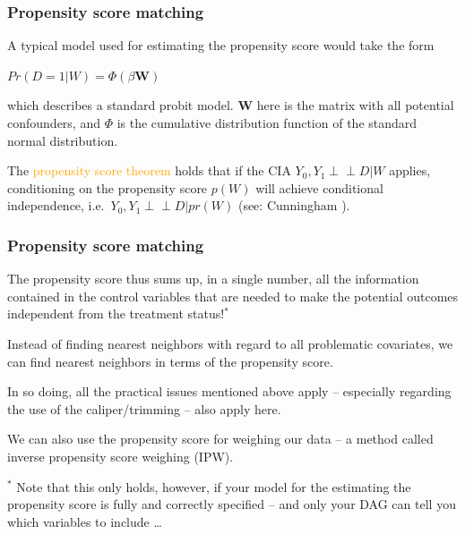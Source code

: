\documentclass[12pt,english,dvipsnames,aspectratio=169,handout]{beamer}\usepackage[]{graphicx}\usepackage[]{xcolor}
\begin{document}
\begin{frame}
  \frametitle{Propensity score matching}
\footnotesize

A typical model used for estimating the propensity score would take the form

$Pr(D = 1|W) = \Phi(\beta \bm{W})$

which describes a standard probit model. $\bm{W}$ here is the matrix with all potential confounders, and $\Phi$ is the cumulative distribution function of the standard normal distribution.

The \textcolor{orange}{propensity score theorem} holds that if the CIA $Y_{0},Y_{1} {\perp\!\!\!\perp} D|W$ applies, conditioning on the propensity score $p(W)$ will achieve conditional independence, i.e.\ $Y_{0},Y_{1} {\perp\!\!\!\perp} D|pr(W)$ (see: Cunningham \citeyear[143]{cunningham_causal_2021}).

\vspace{3cm}

\end{frame}



\begin{frame}
  \frametitle{Propensity score matching}
\footnotesize

The propensity score thus sums up, in a single number, all the information contained in the control variables that are needed to make the potential outcomes independent from the treatment status!$^*$

Instead of finding nearest neighbors with regard to all problematic covariates, we can find nearest neighbors in terms of the propensity score.

In so doing, all the practical issues mentioned above apply -- especially regarding the use of the caliper/trimming -- also apply here. 

We can also use the propensity score for weighing our data -- a method called inverse propensity score weighing (IPW).

\scriptsize $^*$ Note that this only holds, however, if your model for the estimating the propensity score is fully and correctly specified -- and only your DAG can tell you which variables to include \ldots

\end{frame}
\end{document}

